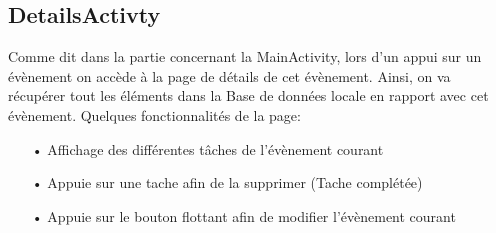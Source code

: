 \documentclass[12pt,a4paper]{report}
\begin{document}
\subsection{DetailsActivty}
\begin{flushleft}
\justify
Comme dit dans la partie concernant la MainActivity, lors d'un appui sur un évènement on accède à la page de détails de cet évènement. Ainsi, on va récupérer tout les éléments dans la Base de données locale en rapport avec cet évènement.
Quelques fonctionnalités de la page:
\begin{itemize}
\item[•] Affichage des différentes tâches de l'évènement courant
\item[•] Appuie sur une tache afin de la supprimer (Tache complétée)
\item[•] Appuie sur le bouton flottant afin de modifier l'évènement courant
\end{itemize}
\end{flushleft}
\end{document}
